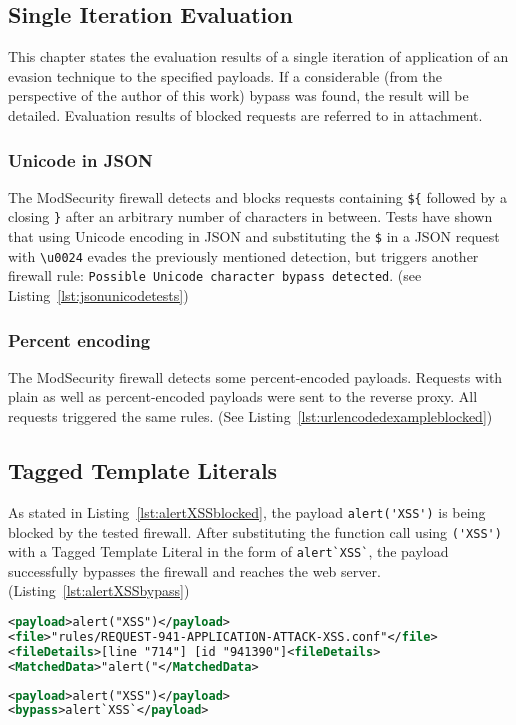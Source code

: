 \subsection{Single Iteration Evaluation}
This chapter states the evaluation results of a single iteration of application of an evasion technique to the specified payloads. If a considerable (from the perspective of the author of this work) bypass was found, the result will be detailed. Evaluation results of blocked requests are referred to in attachment.


\subsubsection{Unicode in JSON}
\label{sec:unicodeinjsontest}
The ModSecurity firewall detects and blocks requests containing \verb|${| followed by a closing \verb|}| after an arbitrary number of characters in between.
Tests have shown that using Unicode encoding in JSON and substituting the \verb|$| in a JSON request with \verb|\u0024| evades the previously mentioned detection, but triggers another firewall rule: \verb|Possible Unicode character bypass detected|.
(see Listing~\ref{lst:jsonunicodetests})


\subsubsection{Percent encoding}
The ModSecurity firewall detects some percent-encoded payloads. Requests with plain as well as percent-encoded payloads were sent to the reverse proxy. All requests triggered the same rules. (See Listing~\ref{lst:urlencodedexampleblocked})


\subsection{Tagged Template Literals}
As stated in Listing~\ref{lst:alertXSSblocked}, the payload \verb|alert('XSS')| is being blocked by the tested firewall.
After substituting the function call using \verb|('XSS')| with a Tagged Template Literal in the form of \verb|alert`XSS`|, the payload successfully bypasses the firewall and reaches the web server. (Listing~\ref{lst:alertXSSbypass})

\begin{lstlisting}[style=ruleStyle, language=XML, caption=alert("XSS") blocked, label=lst:alertXSSblocked]
<payload>alert("XSS")</payload>
<file>"rules/REQUEST-941-APPLICATION-ATTACK-XSS.conf"</file>
<fileDetails>[line "714"] [id "941390"]<fileDetails>
<MatchedData>"alert("</MatchedData>
\end{lstlisting}

\begin{lstlisting}[style=ruleStyle, language=XML, caption=alert`XSS` bypass, label=lst:alertXSSbypass]
<payload>alert("XSS")</payload>
<bypass>alert`XSS`</payload>
\end{lstlisting}


